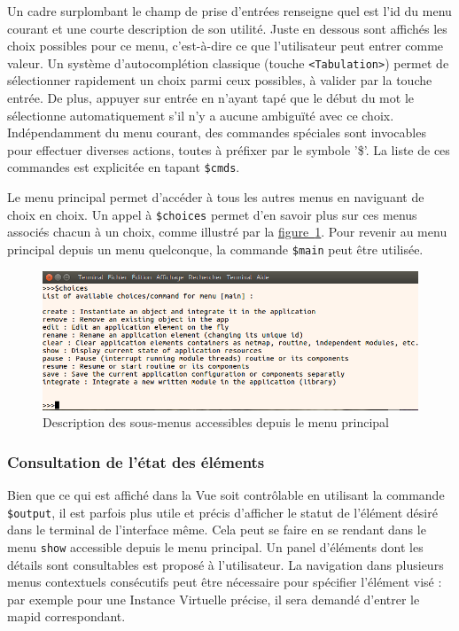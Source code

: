 \documentclass[]{article}
\newcommand{\wordlink}[2]{\hyperref[#1]{#2~\ref{#1}}}
\begin{document}
Un cadre surplombant le champ de prise d'entrées renseigne quel est l'id du menu courant et une courte description de son utilité. Juste en dessous sont affichés les choix possibles pour ce menu, c'est-à-dire ce que l'utilisateur peut entrer comme valeur. Un système d'autocomplétion classique (touche \texttt{<Tabulation>}) permet de sélectionner rapidement un choix parmi ceux possibles, à valider par la touche entrée. De plus, appuyer sur entrée en n'ayant tapé que le début du mot le sélectionne automatiquement s'il n'y a aucune ambiguïté avec ce choix. Indépendamment du menu courant, des commandes spéciales sont invocables pour effectuer diverses actions, toutes à préfixer par le symbole '\$'. La liste de ces commandes est explicitée en tapant \texttt{\$cmds}.\\

\par Le menu principal permet d'accéder à tous les autres menus en naviguant de choix en choix. Un appel à \texttt{\$choices} permet d'en savoir plus sur ces menus associés chacun à un choix, comme illustré par la \wordlink{choicesmain}{figure}. Pour revenir au menu principal depuis un menu quelconque, la commande \texttt{\$main} peut être utilisée.

\begin{figure}[!ht]
\centering
     \includegraphics[width=0.65\linewidth]{choicesmain}
     \caption{Description des sous-menus accessibles depuis le menu principal}
     \label{choicesmain}
\end{figure}

\newpage

\subsubsection{Consultation de l'état des éléments}

Bien que ce qui est affiché dans la Vue soit contrôlable en utilisant la commande \texttt{\$output}, il est parfois plus utile et précis d'afficher le statut de l'élément désiré dans le terminal de l'interface même. Cela peut se faire en se rendant dans le menu \texttt{show} accessible depuis le menu principal. Un panel d'éléments dont les détails sont consultables est proposé à l'utilisateur. La navigation dans plusieurs menus contextuels consécutifs peut être nécessaire pour spécifier l'élément visé : par exemple pour une Instance Virtuelle précise, il sera demandé d'entrer le mapid correspondant.\\
\end{document}

